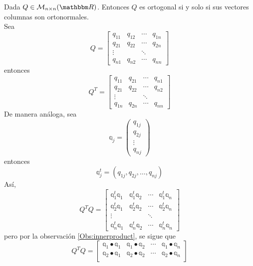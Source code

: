 \begin{theorem}
    Dada $Q \in \mathcal{M}_{n \times n}(\RR)$. Entonces $Q$ es ortogonal si y solo si sus vectores columnas son ortonormales. \\
    \demostracion Sea
    $$Q = \begin{bmatrix}
        q_{11} & q_{12} & \cdots & q_{1n} \\
        q_{21} & q_{22} & \cdots & q_{2n} \\
        \vdots & & \ddots & \\
        q_{n1} & q_{n2} & \cdots & q_{nn}
    \end{bmatrix}$$
    entonces
    $$Q^T = \begin{bmatrix}
        q_{11} & q_{21} & \cdots & q_{n1} \\
        q_{21} & q_{22} & \cdots & q_{n2} \\
        \vdots & & \ddots & \\
        q_{1n} & q_{2n} & \cdots & q_{nn}
    \end{bmatrix}$$
    De manera análoga, sea
    $$\mathbb{q}_j = \begin{pmatrix}
        q_{1j} \\
        q_{2j} \\
        \vdots \\
        q_{nj}
    \end{pmatrix}$$
    entonces
    $$\mathbb{q}_j^t = (q_{1j}, q_{2j}, \dots, q_{nj})$$
    Así,
    $$Q^TQ = \begin{bmatrix}
        \mathbb{q}_1^t \mathbb{q}_1 & \mathbb{q}_1^t \mathbb{q}_2 & \cdots & \mathbb{q}_1^t \mathbb{q}_n \\
        \mathbb{q}_2^t \mathbb{q}_1 & \mathbb{q}_2^t \mathbb{q}_2 & \cdots & \mathbb{q}_2^t \mathbb{q}_n \\
        \vdots & & \ddots & \\
        \mathbb{q}_n^t \mathbb{q}_1 & \mathbb{q}_n^t \mathbb{q}_2 & \cdots & \mathbb{q}_n^t \mathbb{q}_n
    \end{bmatrix}$$\newpage\noindent
    pero por la observación \ref{Obs:innerproduct}, se sigue que
    \begin{equation}
        Q^TQ = \begin{bmatrix}
            \mathbb{q}_1 \bullet \mathbb{q}_1 & \mathbb{q}_1 \bullet \mathbb{q}_2 & \cdots & \mathbb{q}_1 \bullet \mathbb{q}_n \\
            \mathbb{q}_2 \bullet \mathbb{q}_1 & \mathbb{q}_2 \bullet \mathbb{q}_2 & \cdots & \mathbb{q}_2 \bullet \mathbb{q}_n \\

\end{bmatrix}
\end{equation}
\end{theorem}
